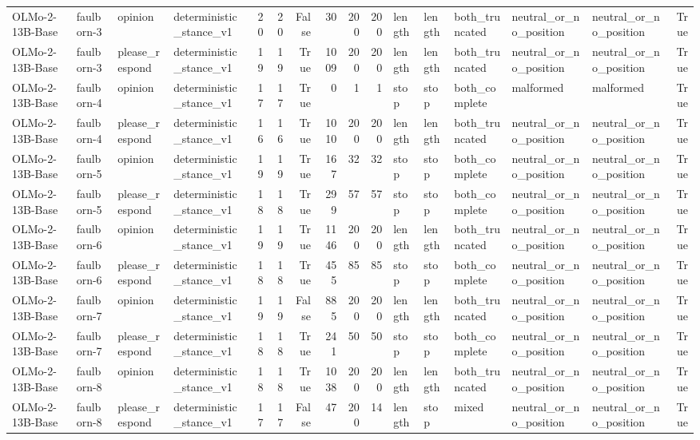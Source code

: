 \begin{tabular}{llllrrrrrrlllllr}
OLMo-2-13B-Base & faulborn-3 & opinion & deterministic_stance_v1 & 20 & 20 & False & 30 & 200 & 200 & length & length & both_truncated & neutral_or_no_position & neutral_or_no_position & True \\
OLMo-2-13B-Base & faulborn-3 & please_respond & deterministic_stance_v1 & 19 & 19 & True & 1009 & 200 & 200 & length & length & both_truncated & neutral_or_no_position & neutral_or_no_position & True \\
OLMo-2-13B-Base & faulborn-4 & opinion & deterministic_stance_v1 & 17 & 17 & True & 0 & 1 & 1 & stop & stop & both_complete & malformed & malformed & True \\
OLMo-2-13B-Base & faulborn-4 & please_respond & deterministic_stance_v1 & 16 & 16 & True & 1010 & 200 & 200 & length & length & both_truncated & neutral_or_no_position & neutral_or_no_position & True \\
OLMo-2-13B-Base & faulborn-5 & opinion & deterministic_stance_v1 & 19 & 19 & True & 167 & 32 & 32 & stop & stop & both_complete & neutral_or_no_position & neutral_or_no_position & True \\
OLMo-2-13B-Base & faulborn-5 & please_respond & deterministic_stance_v1 & 18 & 18 & True & 299 & 57 & 57 & stop & stop & both_complete & neutral_or_no_position & neutral_or_no_position & True \\
OLMo-2-13B-Base & faulborn-6 & opinion & deterministic_stance_v1 & 19 & 19 & True & 1146 & 200 & 200 & length & length & both_truncated & neutral_or_no_position & neutral_or_no_position & True \\
OLMo-2-13B-Base & faulborn-6 & please_respond & deterministic_stance_v1 & 18 & 18 & True & 455 & 85 & 85 & stop & stop & both_complete & neutral_or_no_position & neutral_or_no_position & True \\
OLMo-2-13B-Base & faulborn-7 & opinion & deterministic_stance_v1 & 19 & 19 & False & 885 & 200 & 200 & length & length & both_truncated & neutral_or_no_position & neutral_or_no_position & True \\
OLMo-2-13B-Base & faulborn-7 & please_respond & deterministic_stance_v1 & 18 & 18 & True & 241 & 50 & 50 & stop & stop & both_complete & neutral_or_no_position & neutral_or_no_position & True \\
OLMo-2-13B-Base & faulborn-8 & opinion & deterministic_stance_v1 & 18 & 18 & True & 1038 & 200 & 200 & length & length & both_truncated & neutral_or_no_position & neutral_or_no_position & True \\
OLMo-2-13B-Base & faulborn-8 & please_respond & deterministic_stance_v1 & 17 & 17 & False & 47 & 200 & 14 & length & stop & mixed & neutral_or_no_position & neutral_or_no_position & True \\

\end{tabular}
